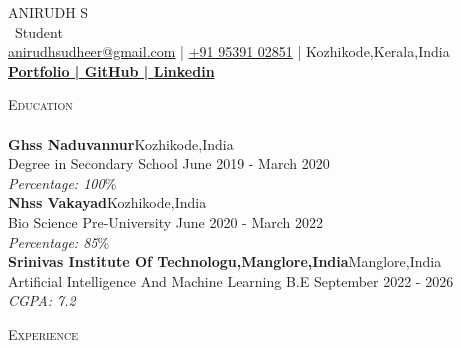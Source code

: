 \documentclass[a4paper]{article}
\newcommand{\lineunder} {
    \vspace*{-8pt} \\
    \hspace*{-18pt} \hrulefill \\
}
\newcommand{\header} [1] {
    {\hspace*{-18pt}\vspace*{6pt} \textsc{#1}}
    \vspace*{-6pt} \lineunder
}
\begin{document}
    \vspace*{-40pt}

    

%
%
  \vspace*{-2pt}
  \begin{center}
    {\Huge \scshape {ANIRUDH S}}\\
    \vspace*{2pt}
    \ {Student}\\
    \vspace*{2pt}
    \href{mailto:anirudhsudheer@gmail.com}{anirudhsudheer@gmail.com} | \href{tel:+91 95391 02851}{+91 95391 02851} | Kozhikode,Kerala,India\\
    \vspace*{2pt}
    \textbf{\href{http://bit.ly/3Du0xXP}{Portfolio | }}\textbf{\href{https://github.com/SudoAnirudh}{GitHub | }}\textbf{\href{https://www.linkedin.com/in/sudoanirudh/}{Linkedin}}\\
  \end{center}



      \header{Education}
      \vspace{2mm}
      \textbf{Ghss Naduvannur}\hfill Kozhikode,India\\
Degree in Secondary School \hfill June 2019 - March 2020\\
{\sl Percentage: 100}\%\\
\vspace{2mm}
      \textbf{Nhss Vakayad}\hfill Kozhikode,India\\
Bio Science Pre-University \hfill June 2020 - March 2022\\
{\sl Percentage: 85}\%\\
\vspace{2mm}
      \textbf{Srinivas Institute Of Technologu,Manglore,India}\hfill Manglore,India\\
Artificial Intelligence And Machine Learning B.E \hfill September 2022 - 2026\\
{\sl CGPA: 7.2}\\
\vspace{2mm}

%
%
  \header{Experience}
  \vspace{2mm}
\end{document}
